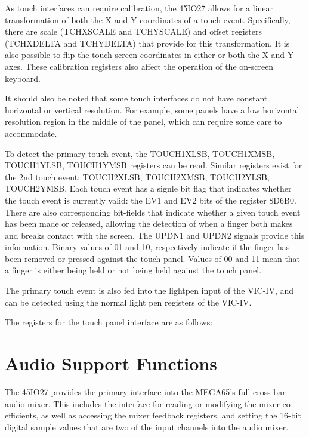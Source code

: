 \begin{enumerate}
As touch interfaces can require calibration, the 45IO27 allows for a
linear transformation of both the X and Y coordinates of a touch
event.  Specifically, there are scale (TCHXSCALE and TCHYSCALE) and
offset registers (TCHXDELTA and TCHYDELTA) that provide for this
transformation. It is also possible to flip the touch screen
coordinates in either or both the X and Y axes.  These calibration
registers also affect the operation of the on-screen keyboard.

It should also be noted that some touch interfaces do not have
constant horizontal or vertical resolution. For example, some panels
have a low horizontal resolution region in the middle of the panel,
which can require some care to accommodate.

To detect the primary touch event, the TOUCH1XLSB, TOUCH1XMSB, TOUCH1YLSB,
TOUCH1YMSB registers can be read.  Similar registers exist for the 2nd
touch event: TOUCH2XLSB, TOUCH2XMSB, TOUCH2YLSB, TOUCH2YMSB. Each
touch event has a signle bit flag that indicates whether the touch
event is currently valid: the EV1 and EV2 bits of the register
\$D6B0.  There are also corresponding bit-fields that indicate whether a
given touch event has been made or released, allowing the detection of
when a finger both makes and breaks contact with the screen.  The
UPDN1 and UPDN2 signals provide this information.  Binary values of 01 and
10, respectively indicate if the finger has been removed or pressed
against the touch panel.  Values of 00 and 11 mean that a finger is
either being held or not being held against the touch panel.

The
primary touch event is also fed into the lightpen input of the VIC-IV,
and can be detected using the normal light pen registers of the VIC-IV.

The registers for the touch panel interface are as follows:



\section{Audio Support Functions}
The 45IO27 provides the primary interface into the MEGA65's full
cross-bar audio mixer. This includes the interface for reading or
modifying the mixer co-efficients, as well as accessing the mixer
feedback registers, and setting the 16-bit digital sample values that
are two of the input channels into the audio mixer.


\end{enumerate}
